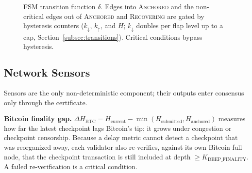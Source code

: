 \begin{figure}[h]
\centering
{}
\vspace{4mm}
\caption{FSM transition function $\delta$. Edges into \textsc{Anchored} and
the non-critical edges out of \textsc{Anchored} and \textsc{Recovering} are
gated by hysteresis counters ($k_{\downarrow}$, $k_{\uparrow}$, and $H$;
$k_{\downarrow}$ doubles per flap level up to a cap,
Section~\ref{subsec:transitions}). Critical conditions bypass hysteresis.}
\label{fig:fsm}
\end{figure}

\subsection{Network Sensors}
\label{subsec:sensors}

Sensors are the only non-deterministic component; their outputs enter
consensus only through the certificate.

\textbf{Bitcoin finality gap.} $\Delta H_{\text{BTC}} = H_{\text{current}} -
\min(H_{\text{submitted}}, H_{\text{anchored}})$ measures how far the latest
checkpoint lags Bitcoin's tip; it grows under congestion or checkpoint
censorship. Because a delay metric cannot detect a checkpoint that was
reorganized away, each validator also re-verifies, against its own Bitcoin
full node, that the checkpoint transaction is still included at depth
$\geq K_{\text{DEEP\_FINALITY}}$. A failed re-verification is a critical
condition.

